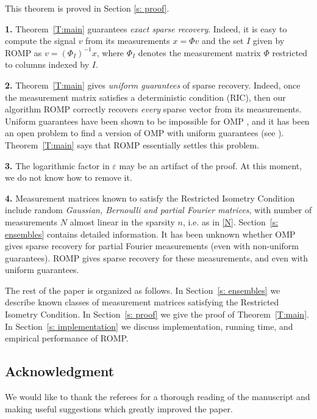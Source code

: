 \documentclass[12pt]{amsart}
\theoremstyle{plain}
\theoremstyle{definition}
\theoremstyle{remark}
\numberwithin{equation}{section}
\begin{document}
\medskip

This theorem is proved in Section \ref{s: proof}.

\medskip

\begin{remarks}
  {\bf 1. } Theorem~\ref{T:main} guarantees {\em exact sparse recovery}.
  Indeed, it is easy to compute the signal $v$ from its measurements $x = \Phi v$ 
  and the set $I$ given by ROMP as $v = (\Phi_I)^{-1} x$,
  where $\Phi_I$ denotes the measurement matrix $\Phi$ restricted to columns
  indexed by $I$.

  {\bf 2.} Theorem~\ref{T:main} gives {\em uniform guarantees} of sparse recovery.
  Indeed, once the measurement matrix satisfies a deterministic condition (RIC),
  then our algorithm ROMP correctly recovers {\em every} sparse vector from its measurements. 
  Uniform guarantees have been shown to be impossible for OMP \cite{R}, and it has been 
  an open problem to find a version of OMP with uniform guarantees (see \cite{TG}). 
  Theorem~\ref{T:main} says that ROMP essentially settles this problem.

  {\bf 3. } The logarithmic factor in ${\varepsilon}$ may be an artifact of the proof. 
  At this moment, we do not know how to remove it.
    
  {\bf 4. } Measurement matrices known to satisfy the Restricted Isometry 
  Condition include random {\em Gaussian, Bernoulli and partial Fourier matrices},
  with number of measurements $N$ almost linear in the sparsity $n$, i.e. 
  as in \eqref{N}. Section~\ref{s: ensembles} contains detailed information.
  It has been unknown whether OMP gives sparse recovery for partial Fourier
  measurements (even with non-uniform guarantees). ROMP gives sparse recovery 
  for these measurements, and even with uniform guarantees. 
  
\end{remarks}

\medskip

The rest of the paper is organized as follows. 
In Section~\ref{s: ensembles} we describe known classes of measurement matrices
satisfying the Restricted Isometry Condition.
In Section~\ref{s: proof} we give the proof of Theorem~\ref{T:main}.
In Section~\ref{s: implementation} we discuss implementation, running time, and
empirical performance of ROMP.

\subsection*{Acknowledgment}
We would like to thank the referees for a thorough reading of the manuscript and making
useful suggestions which greatly improved the paper.
\end{document}
